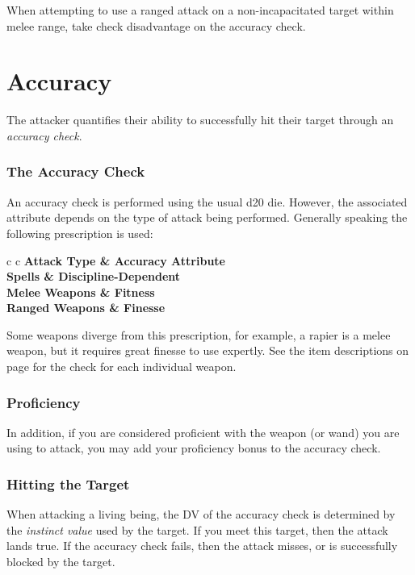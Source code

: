 When attempting to use a ranged attack on a non-incapacitated target within melee range, take check disadvantage on the accuracy check.

\section{Accuracy}

The attacker quantifies their ability to successfully hit their target through an {\it accuracy check}. 

\subsubsection{The Accuracy Check}

An accuracy check is performed using the usual d20 die. However, the associated attribute depends on the type of attack being performed. Generally speaking the following prescription is used:

\begin{center}
\begin{rndtable}{c c}
\bf Attack Type	&	\bf Accuracy Attribute
\\
Spells	&	Discipline-Dependent
\\
Melee Weapons	& Fitness
\\
Ranged Weapons	&	Finesse
\end{rndtable}
\end{center}

Some weapons diverge from this prescription, for example, a rapier is a melee weapon, but it requires great finesse to use expertly. See the item descriptions on page \pageref{S:WeaponList} for the check for each individual weapon. 

\subsubsection{Proficiency}

In addition, if you are considered proficient with the weapon (or wand) you are using to attack, you may add your proficiency bonus to the accuracy check. 

\subsubsection{Hitting the Target}

When attacking a living being, the DV of the accuracy check is determined by the {\it instinct value} used by the target. If you meet this target, then the attack lands true. If the accuracy check fails, then the attack misses, or is successfully blocked by the target. 


